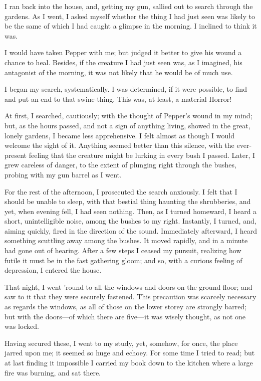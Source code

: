 I ran back into the house, and, getting my gun, sallied out to search through the gardens. As I went, I asked myself whether the thing I had just seen was likely to be the same of which I had caught a glimpse in the morning. I inclined to think it was.

I would have taken Pepper with me; but judged it better to give his wound a chance to heal. Besides, if the creature I had just seen was, as I imagined, his antagonist of the morning, it was not likely that he would be of much use.

I began my search, systematically. I was determined, if it were possible, to find and put an end to that swine-thing. This was, at least, a material Horror!

At first, I searched, cautiously; with the thought of Pepper’s wound in my mind; but, as the hours passed, and not a sign of anything living, showed in the great, lonely gardens, I became less apprehensive. I felt almost as though I would welcome the sight of it. Anything seemed better than this silence, with the ever-present feeling that the creature might be lurking in every bush I passed. Later, I grew careless of danger, to the extent of plunging right through the bushes, probing with my gun barrel as I went.

For the rest of the afternoon, I prosecuted the search anxiously. I felt that I should be unable to sleep, with that bestial thing haunting the shrubberies, and yet, when evening fell, I had seen nothing. Then, as I turned homeward, I heard a short, unintelligible noise, among the bushes to my right. Instantly, I turned, and, aiming quickly, fired in the direction of the sound. Immediately afterward, I heard something scuttling away among the bushes. It moved rapidly, and in a minute had gone out of hearing. After a few steps I ceased my pursuit, realizing how futile it must be in the fast gathering gloom; and so, with a curious feeling of depression, I entered the house.

That night, I went ’round to all the windows and doors on the ground floor; and saw to it that they were securely fastened. This precaution was scarcely necessary as regards the windows, as all of those on the lower storey are strongly barred; but with the doors---of which there are five---it was wisely thought, as not one was locked.

Having secured these, I went to my study, yet, somehow, for once, the place jarred upon me; it seemed so huge and echoey. For some time I tried to read; but at last finding it impossible I carried my book down to the kitchen where a large fire was burning, and sat there.

